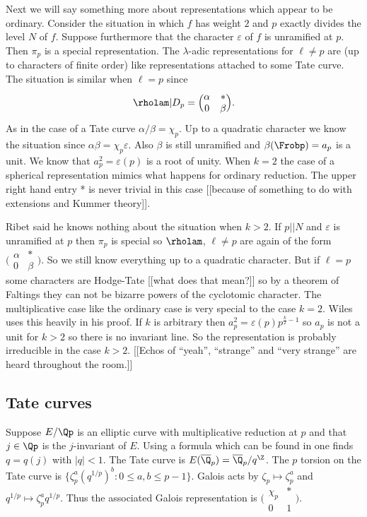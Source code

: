 \documentclass{report}
\begin{document}
Next we will say something more about representations which appear
to be ordinary. Consider the situation in which $f$ has weight $2$
and $p$ exactly divides the level $N$ of $f$. Suppose furthermore
that the character $\varepsilon$ of $f$ is unramified at $p$.
Then $\pi_p$ is a special representation. The $\lambda$-adic representations
for $\ell\neq p$ are (up to characters of finite order) like
representations attached to some Tate curve. The situation is
similar when $\ell=p$ since
$$\rholam|D_p=\Bigl(\begin{matrix}\alpha&*\\0&\beta\end{matrix}\Bigr).$$
As in the case of a Tate curve $\alpha/\beta=\chi_p$. Up to a quadratic character we
know the situation since $\alpha\beta=\chi_p\varepsilon$.
Also $\beta$ is still unramified and $\beta(\Frobp)=a_p$ is a unit.
We know that $a_p^2=\varepsilon(p)$ is a root of unity.
When $k=2$ the case of a spherical representation mimics what happens
for ordinary reduction. The upper right hand entry * is never trivial in
this case [[because of something to do with extensions and Kummer theory]].

Ribet said he knows nothing about  the situation when $k>2$. If $p||N$ and
$\varepsilon$ is unramified at $p$
then $\pi_p$ is special so $\rholam$, $\ell\neq p$ are
again of the form $\bigl(\begin{smallmatrix}\alpha&*\\0&\beta\end{smallmatrix}\bigr)$.
So we still know everything up to a quadratic character.
But if $\ell=p$ some characters are Hodge-Tate [[what does that mean?]]
so by a theorem of Faltings they can not be bizarre powers of the
cyclotomic character. The multiplicative case like the ordinary case
is very special to the case $k=2$. Wiles uses this heavily in his proof.
If $k$ is arbitrary then $a_p^2=\varepsilon(p)p^{\frac{k}{2}-1}$
so $a_p$ is not a unit for $k>2$
so there is no invariant line.  So the representation is probably
irreducible in the case $k>2$. [[Echos
of ``yeah'', ``strange'' and ``very strange'' are heard throughout the room.]]

\subsection{Tate curves}
Suppose $E/\Qp$ is an elliptic curve with multiplicative reduction
at $p$ and that $j\in\Qp$ is the $j$-invariant of $E$. Using a
formula which can be found in \cite[V]{silverman:aec2} one
finds $q=q(j)$ with $|q|<1$. The Tate curve is
$E(\overline{\Q}_p)=\overline{\Q}_p/q^{\Z}$. The $p$ torsion
on the Tate curve is
$\{\zeta_p^a(q^{1/p})^b : 0\leq a,b\leq p-1\}$.
Galois acts by $\zeta_p\mapsto\zeta_p^a$ and
$q^{1/p}\mapsto\zeta_p^a q^{1/p}$. Thus the associated Galois representation
is $\bigl(\begin{smallmatrix}\chi_p&*\\0&1\end{smallmatrix}\bigr)$.
\end{document}
